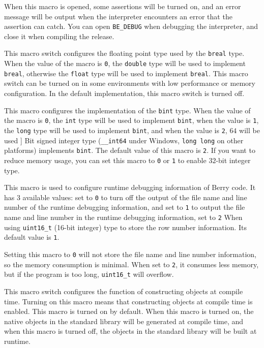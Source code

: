 When this macro is opened, some assertions will be turned on, and an error message will be output when the interpreter encounters an error that the assertion can catch. You can open \texttt{BE\_DEBUG} when debugging the interpreter, and close it when compiling the release.


This macro switch configures the floating point type used by the \texttt{breal} type. When the value of the macro is \texttt{0}, the \texttt{double} type will be used to implement \texttt{breal}, otherwise the \texttt{float} type will be used to implement \texttt{breal}. This macro switch can be turned on in some environments with low performance or memory configuration. In the default implementation, this macro switch is turned off.


This macro configures the implementation of the \texttt{bint} type. When the value of the macro is \texttt{0}, the \texttt{int} type will be used to implement \texttt{bint}, when the value is \texttt{1}, the \texttt{long} type will be used to implement \texttt{bint}, and when the value is \texttt{2}, $64$ will be used ] Bit signed integer type (\texttt{\_\_int64} under Windows, \texttt{long long} on other platforms) implements \texttt{bint}. The default value of this macro is \texttt{2}. If you want to reduce memory usage, you can set this macro to \texttt{0} or \texttt{1} to enable $32$-bit integer type.


This macro is used to configure runtime debugging information of Berry code. It has 3 available values: set to \texttt{0} to turn off the output of the file name and line number of the runtime debugging information, and set to \texttt{1} to output the file name and line number in the runtime debugging information, set to \texttt{2} When using \texttt{uint16\_t} (16-bit integer) type to store the row number information. Its default value is \texttt{1}.

Setting this macro to \texttt{0} will not store the file name and line number information, so the memory consumption is minimal. When set to \texttt{2}, it consumes less memory, but if the program is too long, \texttt{uint16\_t} will overflow.


This macro switch configures the function of constructing objects at compile time. Turning on this macro means that constructing objects at compile time is enabled. This macro is turned on by default. When this macro is turned on, the native objects in the standard library will be generated at compile time, and when this macro is turned off, the objects in the standard library will be built at runtime.

